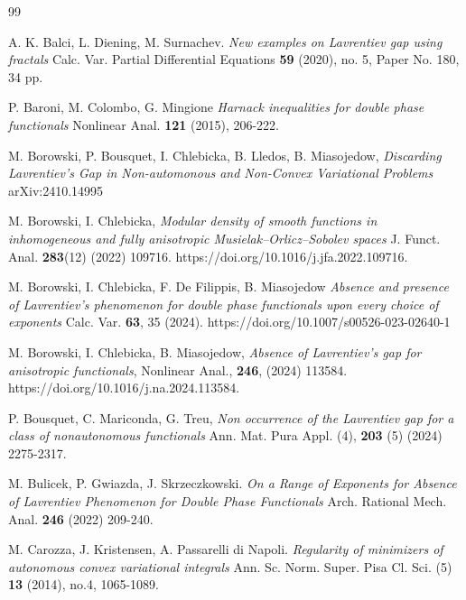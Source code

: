 \documentclass[a4paper,10pt]{article}
\theoremstyle{plain}
\theoremstyle{definition}
\numberwithin{equation}{section} \makeatletter
\begin{document}
\begin{thebibliography}{99}


A. K. Balci, L. Diening, M. Surnachev.  
{\em New examples on Lavrentiev gap using fractals}
{Calc. Var. Partial Differential Equations}
 {\bf 59} (2020), no. 5, Paper No. 180, 34 pp.


P. Baroni, M. Colombo, G. Mingione {\em Harnack inequalities for double phase functionals} 
Nonlinear Anal. {\bf 121} (2015), 206-222.

 M. Borowski, P. Bousquet, I. Chlebicka, B. Lledos, B. Miasojedow, 
{\em Discarding Lavrentiev's Gap
 in Non-automonous and Non-Convex Variational Problems}
arXiv:2410.14995

 M. Borowski, I. Chlebicka, {\em Modular density of smooth functions in inhomogeneous and fully anisotropic Musielak–Orlicz–Sobolev spaces} J. Funct. Anal. {\bf 283}(12) (2022) 109716. https://doi.org/10.1016/j.jfa.2022.109716.

 M. Borowski, I. Chlebicka, F. De Filippis, B. Miasojedow {\em Absence and presence of Lavrentiev’s phenomenon for
double phase functionals upon every choice of exponents}  Calc. Var. {\bf 63}, 35 (2024).  https://doi.org/10.1007/s00526-023-02640-1

 M. Borowski, I. Chlebicka, B. Miasojedow, {\em Absence of Lavrentiev’s gap for anisotropic functionals}, Nonlinear Anal.,
{\bf 246}, (2024) 113584. https://doi.org/10.1016/j.na.2024.113584.

P. Bousquet, C. Mariconda, G. Treu, 
{\em Non occurrence of the Lavrentiev
 gap for a class of nonautonomous functionals} Ann. Mat. Pura Appl. (4),
 {\bf 203} (5) (2024) 2275-2317.


M. Bulicek, P. Gwiazda, J. Skrzeczkowski. {\em On a Range of Exponents for Absence of Lavrentiev Phenomenon for Double Phase Functionals} {Arch. Rational Mech. Anal.} {\bf 246} (2022) 209-240.



M. Carozza, J. Kristensen, A. Passarelli di Napoli. 
{\em Regularity of minimizers of autonomous convex variational integrals}
{Ann. Sc. Norm. Super. Pisa Cl. Sci.} (5) {\bf 13} (2014), no.4, 1065-1089.


\end{thebibliography}
\end{document}
